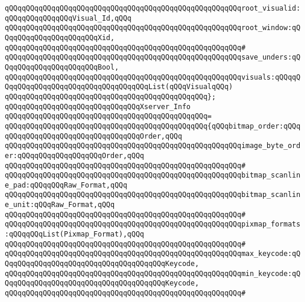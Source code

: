 \verb|qQQqqQQqqQQqqQQqqQQqqQQqqQQqqQQqqQQqqQQqqQQqqQQqqQQqqQQqroot_visualid:qQQqqQQqqQQqqQQqVisual_Id,qQQq|\newline
\verb|qQQqqQQqqQQqqQQqqQQqqQQqqQQqqQQqqQQqqQQqqQQqqQQqqQQqqQQqroot_window:qQQqqQQqqQQqqQQqqQQqqQQqXid,|\newline
\verb|qQQqqQQqqQQqqQQqqQQqqQQqqQQqqQQqqQQqqQQqqQQqqQQqqQQqqQQq#|\newline
\verb|qQQqqQQqqQQqqQQqqQQqqQQqqQQqqQQqqQQqqQQqqQQqqQQqqQQqqQQqsave_unders:qQQqqQQqqQQqqQQqqQQqqQQqBool,|\newline
\verb|qQQqqQQqqQQqqQQqqQQqqQQqqQQqqQQqqQQqqQQqqQQqqQQqqQQqqQQqvisuals:qQQqqQQqqQQqqQQqqQQqqQQqqQQqqQQqqQQqqQQqList(qQQqVisualqQQq)|\newline
\verb|qQQqqQQqqQQqqQQqqQQqqQQqqQQqqQQqqQQqqQQqqQQqqQQq};|\newline
\newline
\verb|qQQqqQQqqQQqqQQqqQQqqQQqqQQqqQQqXserver_Info|\newline
\verb|qQQqqQQqqQQqqQQqqQQqqQQqqQQqqQQqqQQqqQQqqQQqqQQq=|\newline
\verb|qQQqqQQqqQQqqQQqqQQqqQQqqQQqqQQqqQQqqQQqqQQqqQQq{qQQqbitmap_order:qQQqqQQqqQQqqQQqqQQqqQQqqQQqqQQqqQQqOrder,qQQq|\newline
\verb|qQQqqQQqqQQqqQQqqQQqqQQqqQQqqQQqqQQqqQQqqQQqqQQqqQQqqQQqimage_byte_order:qQQqqQQqqQQqqQQqqQQqOrder,qQQq|\newline
\verb|qQQqqQQqqQQqqQQqqQQqqQQqqQQqqQQqqQQqqQQqqQQqqQQqqQQqqQQq#|\newline
\verb|qQQqqQQqqQQqqQQqqQQqqQQqqQQqqQQqqQQqqQQqqQQqqQQqqQQqqQQqbitmap_scanline_pad:qQQqqQQqRaw_Format,qQQq|\newline
\verb|qQQqqQQqqQQqqQQqqQQqqQQqqQQqqQQqqQQqqQQqqQQqqQQqqQQqqQQqbitmap_scanline_unit:qQQqRaw_Format,qQQq|\newline
\verb|qQQqqQQqqQQqqQQqqQQqqQQqqQQqqQQqqQQqqQQqqQQqqQQqqQQqqQQq#|\newline
\verb|qQQqqQQqqQQqqQQqqQQqqQQqqQQqqQQqqQQqqQQqqQQqqQQqqQQqqQQqpixmap_formats:qQQqqQQqList(Pixmap_Format),qQQq|\newline
\verb|qQQqqQQqqQQqqQQqqQQqqQQqqQQqqQQqqQQqqQQqqQQqqQQqqQQqqQQq#|\newline
\verb|qQQqqQQqqQQqqQQqqQQqqQQqqQQqqQQqqQQqqQQqqQQqqQQqqQQqqQQqmax_keycode:qQQqqQQqqQQqqQQqqQQqqQQqqQQqqQQqqQQqqQQqKeycode,|\newline
\verb|qQQqqQQqqQQqqQQqqQQqqQQqqQQqqQQqqQQqqQQqqQQqqQQqqQQqqQQqmin_keycode:qQQqqQQqqQQqqQQqqQQqqQQqqQQqqQQqqQQqqQQqKeycode,|\newline
\verb|qQQqqQQqqQQqqQQqqQQqqQQqqQQqqQQqqQQqqQQqqQQqqQQqqQQqqQQq#|\newline
